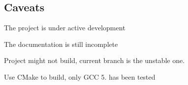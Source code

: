 \subsection*{Caveats}


\begin{DoxyItemize}
\item The project is under active development
\item The documentation is still incomplete
\item Project might not build, current branch is the unstable one.
\item Use C\+Make to build, only G\+CC 5. has been tested 
\end{DoxyItemize}